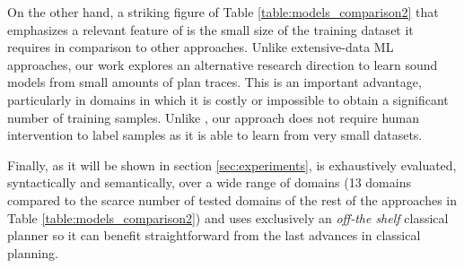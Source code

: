 On the other hand, a striking figure of Table \ref{table:models_comparison2} that emphasizes a relevant feature of \FAMA is the small size of the training dataset it requires in comparison to other approaches. Unlike extensive-data ML approaches, our work explores an alternative research direction to learn sound models from small amounts of plan traces. This is an important advantage, particularly in domains in which it is costly or impossible to obtain a significant number of training samples. Unlike \CAMA, our approach does not require human intervention to label samples as it is able to learn from very small datasets.

Finally, as it will be shown in section \ref{sec:experiments}, \FAMA is exhaustively evaluated, syntactically and semantically, over a wide range of domains (13 domains compared to the scarce number of tested domains of the rest of the approaches in Table \ref{table:models_comparison2}) and uses exclusively an \emph{off-the shelf} classical planner so it can benefit straightforward from the last advances in classical planning.


























